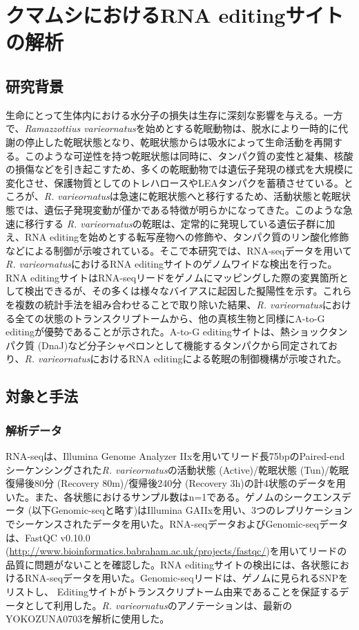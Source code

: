 \chapter{クマムシにおけるRNA editingサイトの解析}

\section{研究背景}
生命にとって生体内における水分子の損失は生存に深刻な影響を与える。一方で、{\it Ramazzottius varieornatus}を始めとする乾眠動物は、脱水により一時的に代謝の停止した乾眠状態となり、乾眠状態からは吸水によって生命活動を再開する。このような可逆性を持つ乾眠状態は同時に、タンパク質の変性と凝集、核酸の損傷などを引き起こすため、多くの乾眠動物では遺伝子発現の様式を大規模に変化させ、保護物質としてのトレハロースやLEAタンパクを蓄積させている。ところが、{\it R. varieornatus}は急速に乾眠状態へと移行するため、活動状態と乾眠状態では、遺伝子発現変動が僅かである特徴が明らかになってきた。このような急速に移行する {\it R. varieornatus}の乾眠は、定常的に発現している遺伝子群に加え、RNA editingを始めとする転写産物への修飾や、タンパク質のリン酸化修飾などによる制御が示唆されている。そこで本研究では、RNA-seqデータを用いて{\it R. varieornatus}におけるRNA editingサイトのゲノムワイドな検出を行った。RNA editingサイトはRNA-seqリードをゲノムにマッピングした際の変異箇所として検出できるが、その多くは様々なバイアスに起因した擬陽性を示す。これらを複数の統計手法を組み合わせることで取り除いた結果、{\it R. varieornatus}における全ての状態のトランスクリプトームから、他の真核生物と同様にA-to-G editingが優勢であることが示された。A-to-G editingサイトは、熱ショックタンパク質 (DnaJ)など分子シャペロンとして機能するタンパクから同定されており、{\it R. varieornatus}におけるRNA editingによる乾眠の制御機構が示唆された。

\section{対象と手法}
\subsection{解析データ}
RNA-seqは、Illumina Genome Analyzer IIxを用いてリード長75bpのPaired-endシーケンシングされた{\it R. varieornatus}の活動状態 (Active)/乾眠状態 (Tun)/乾眠復帰後80分 (Recovery 80m)/復帰後240分 (Recovery 3h)の計4状態のデータを用いた。また、各状態におけるサンプル数はn=1である。ゲノムのシークエンスデータ (以下Genomic-seqと略す)はIllumina GAIIxを用い、3つのレプリケーションでシーケンスされたデータを用いた。RNA-seqデータおよびGenomic-seqデータは、FastQC v0.10.0 (\url{http://www.bioinformatics.babraham.ac.uk/projects/fastqc/})を用いてリードの品質に問題がないことを確認した。RNA editingサイトの検出には、各状態におけるRNA-seqデータを用いた。Genomic-seqリードは、ゲノムに見られるSNPをリストし、 Editingサイトがトランスクリプトーム由来であることを保証するデータとして利用した。{\it R. varieornatus}のアノテーションは、最新のYOKOZUNA0703を解析に使用した。

